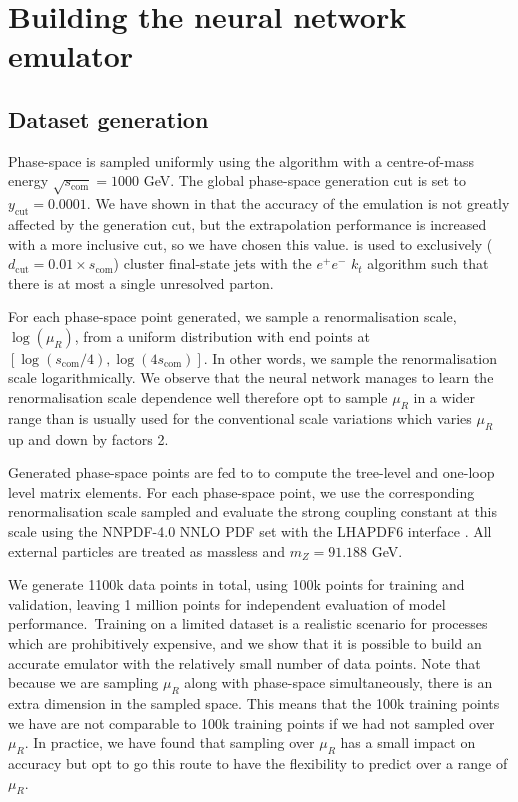 \documentclass[main.tex]{subfiles}
\begin{document}
\section{Building the neural network emulator}\label{sec:1L_nn}
\subsection*{Dataset generation}
Phase-space is sampled uniformly using the {\RAMBO} algorithm
\cite{Kleiss:1985gy} with a centre-of-mass energy
$\sqrt{s_{\mathrm{com}}} = 1000$ GeV. The global phase-space
generation cut is set to $y_{\mathrm{cut}} = 0.0001$.
We have shown in \cite{Maitre:2021uaa} that the accuracy of the emulation
is not greatly affected by the generation cut, but the extrapolation
performance is increased with a more inclusive cut, so we have chosen this
value. 
{\FastJet} \cite{Cacciari:2011ma,noel_dawe_2021_4446849} is
used to exclusively ($d_{\mathrm{cut}} = 0.01 \times s_{\mathrm{com}}$)
cluster final-state jets with the $e^{+}e^{-}$ $k_{t}$
algorithm such that there is at most a single unresolved parton.

For each phase-space point generated, we sample a
renormalisation scale, $\log(\mu_{R})$, from a uniform distribution
with end points at $[\log(s_{\mathrm{com}}/4), \log(4s_{\mathrm{com}})]$.
In other words, we sample the renormalisation scale logarithmically.
We observe that the neural network manages to learn the
renormalisation scale dependence well therefore opt to
sample $\mu_{R}$ in a wider range than is usually used
for the conventional scale variations which varies $\mu_{R}$
up and down by factors 2.

Generated phase-space points are fed to {\MadGraph} \cite{Alwall:2014hca,Hirschi:2011pa}
to compute the tree-level and one-loop level matrix elements.
For each phase-space point, we use the corresponding
renormalisation scale sampled and evaluate the strong coupling
constant at this scale using the NNPDF-4.0 NNLO PDF set
\cite{NNPDF:2021njg} with the LHAPDF6 interface \cite{Buckley:2014ana}.
All external particles are treated as massless and $m_{Z} = 91.188$ GeV.

We generate 1100k data points in total, using 100k points for
training and validation, leaving 1 million points
for independent evaluation of model performance.\
Training on a limited dataset is a realistic scenario
for processes which are prohibitively expensive, and we show
that it is possible to build an accurate emulator with the relatively
small number of data points. Note that because we are
sampling $\mu_{R}$ along with phase-space simultaneously,
there is an extra dimension in the sampled space. This means that the 100k
training points we have are not comparable to 100k training points
if we had not sampled over $\mu_{R}$. In practice, we have found that
sampling over $\mu_{R}$ has a small impact on accuracy but
opt to go this route to have the flexibility to predict over
a range of $\mu_{R}$.
\end{document}
